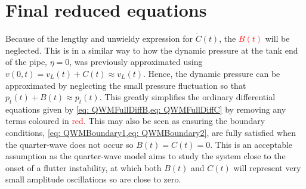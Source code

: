 



%

\section{Final reduced equations} \label{subsec: QWMFinalDimensional}


Because of the lengthy and unwieldy expression for $\dot{C}(t)$, the \textcolor{Red}{$B(t)$} will be neglected. This is in a similar way to how the dynamic pressure at the tank end of the pipe, $\eta = 0$, was previously approximated using $v(0,t) = v_L(t) + C(t) \approx v_L(t)$. Hence, the dynamic pressure can be approximated by neglecting the small pressure fluctuation so that $p_t(t) + B(t) \approx p_t(t)$. This greatly simplifies the ordinary differential equations given by \cref{eq: QWMFullDiffB,eq: QWMFullDiffC} by removing any terms coloured in \textcolor{Red}{red}. This may also be seen as ensuring the boundary conditions, \cref{eq: QWMBoundary1,eq: QWMBoundary2}, are fully satisfied when the quarter-wave does not occur so $B(t) = C(t) = 0$. This is an acceptable assumption as the quarter-wave model aims to study the system close to the onset of a flutter instability, at which both $B(t)$ and $C(t)$ will represent very small amplitude oscillations so are close to zero.


